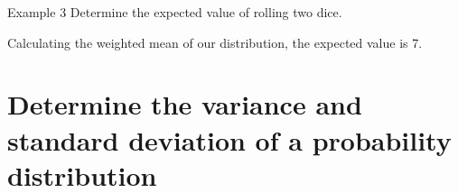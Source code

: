 \documentclass[t]{beamer}
\begin{document}
\begin{frame}{Example 3}
Determine the expected value of rolling two dice.	\newline\\	\pause

Calculating the weighted mean of our distribution, the expected value is 7.
\end{frame}







\section{Determine the variance and standard deviation of a probability distribution}
\end{document}
